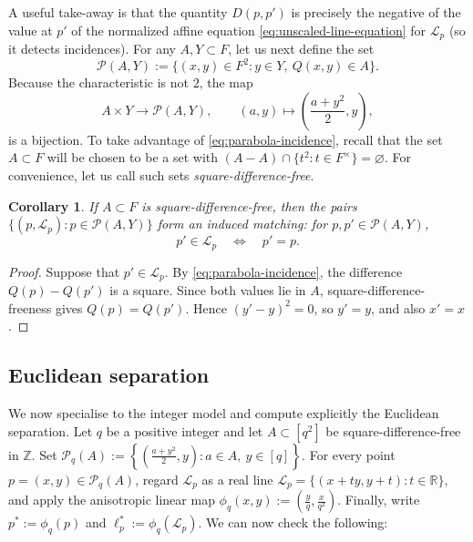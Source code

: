 \documentclass[11pt,reqno]{amsart}
\newtheorem{corollary}[corollary]{Corollary}
\theoremstyle{definition}
\theoremstyle{remark}
\newcommand{\Z}{\mathbb{Z}}
\begin{document}
A useful take-away is that the quantity $D(p,p')$ is precisely the negative of the value at
$p'$ of the normalized affine equation \eqref{eq:unscaled-line-equation} for $\mathcal L_p$ (so it detects incidences). For any $A,Y\subset F$, let us next define the set
\begin{equation}
\label{eq:P-A-Y}
        \mathcal P(A,Y)
        :=\{(x,y)\in F^2:y\in Y,\ Q(x,y)\in A\}.
\end{equation}
Because the characteristic is not $2$, the map
\begin{equation}
\label{eq:A-Y-bijection}
        A\times Y\longrightarrow\mathcal P(A,Y),
        \qquad
        (a,y)\longmapsto\left(\frac{a+y^2}{2},y\right),
\end{equation}
is a bijection. To take advantage of \eqref{eq:parabola-incidence}, recall that the set $A \subset F$ will be chosen to be a set with $(A-A)\cap\{t^2:t\in F^\times\}=\varnothing$. For convenience, let us call such sets \emph{square-difference-free}. 

\begin{corollary}
\label{cor:algebraic-matching}
If $A\subset F$ is square-difference-free, then the pairs $\{(p,\mathcal L_p):p\in\mathcal P(A,Y)\}$ form an induced matching: for $p,p'\in\mathcal P(A,Y)$,
\[
        p'\in\mathcal L_p
        \quad\Longleftrightarrow\quad
        p'=p.
\]
\end{corollary}

\begin{proof}
Suppose that $p'\in\mathcal L_p$.  By
\eqref{eq:parabola-incidence}, the difference $Q(p)-Q(p')$ is a square.
Since both values lie in $A$, square-difference-freeness gives
$Q(p)=Q(p')$.  Hence $(y'-y)^2=0$, so $y'=y$, and also $x'=x$.
\end{proof}

\subsection{Euclidean separation}

We now specialise to the integer model and compute explicitly the Euclidean separation.  Let
$q$ be a positive integer and let $A\subset[q^2]$ be
square-difference-free in $\Z$.  Set $\mathcal P_q(A):=\left\{\left(\frac{a+y^2}{2},y\right): a\in A,\ y\in[q]\right\}$. For every point $p=(x,y)\in\mathcal P_q(A)$, regard $\mathcal L_p$ as a real line $\mathcal L_p=\{(x+ty,y+t):t\in \mathbb{R}\}$, and apply the anisotropic linear map $\phi_q(x,y):=\left(\frac{y}{q},\frac{x}{q^2}\right)$. Finally, write $p^*:=\phi_q(p)$ and $\ell_p^*:=\phi_q(\mathcal L_p)$. We can now check the following:
\end{document}
